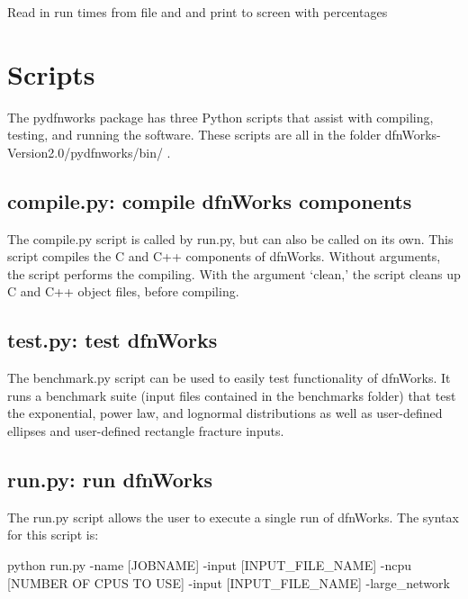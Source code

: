\documentclass[letterpaper,10pt,english]{sphinxmanual}
\begin{document}

\begin{fulllineitems}
\label{pydfnworks:pydfnworks.helper.print_run_time}
Read in run times from file and and print to screen with percentages

\end{fulllineitems}



\chapter{Scripts}
\label{scripts:scripts}\label{scripts::doc}\label{scripts:scripts-chapter}
The pydfnworks package has three Python scripts that assist with compiling, testing, and running the software. These scripts are all in the folder dfnWorks-Version2.0/pydfnworks/bin/ .


\section{compile.py: compile dfnWorks components}
\label{scripts:compile-py-compile-dfnworks-components}
The compile.py script is called by run.py, but can also be called on its own. This script compiles the C and C++ components of dfnWorks. Without arguments, the script performs the compiling. With the argument `clean,' the script cleans up C and C++ object files, before compiling.


\section{test.py: test dfnWorks}
\label{scripts:test-py-test-dfnworks}
The benchmark.py script can be used to easily test functionality of dfnWorks. It runs a benchmark suite (input files contained in the benchmarks folder) that test the exponential, power law, and lognormal distributions as well as user-defined ellipses and user-defined rectangle fracture inputs.


\section{run.py: run dfnWorks}
\label{scripts:run-py-run-dfnworks}
The run.py script allows the user to execute a single run of dfnWorks. The syntax for this script is:

python run.py -name {[}JOBNAME{]} -input {[}INPUT\_FILE\_NAME{]} -ncpu {[}NUMBER OF CPUS TO USE{]} -input {[}INPUT\_FILE\_NAME{]} -large\_network
\end{document}
